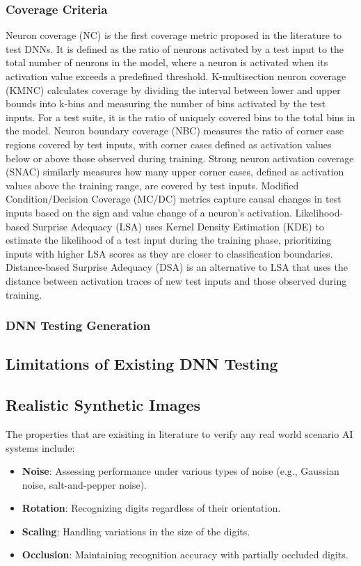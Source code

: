 \documentclass[10pt, conference, a4paper, final]{IEEEtran}
\begin{document}
\subsubsection{Coverage Criteria}
Neuron coverage (NC) is the first coverage metric proposed in the literature to test DNNs. It is defined as the ratio of neurons activated by a test input to the total number of neurons in the model, where a neuron is activated when its activation value exceeds a predefined threshold. K-multisection neuron coverage (KMNC) calculates coverage by dividing the interval between lower and upper bounds into k-bins and measuring the number of bins activated by the test inputs. For a test suite, it is the ratio of uniquely covered bins to the total bins in the model. Neuron boundary coverage (NBC) measures the ratio of corner case regions covered by test inputs, with corner cases defined as activation values below or above those observed during training. Strong neuron activation coverage (SNAC) similarly measures how many upper corner cases, defined as activation values above the training range, are covered by test inputs. Modified Condition/Decision Coverage (MC/DC) metrics capture causal changes in test inputs based on the sign and value change of a neuron’s activation. Likelihood-based Surprise Adequacy (LSA) uses Kernel Density Estimation (KDE) to estimate the likelihood of a test input during the training phase, prioritizing inputs with higher LSA scores as they are closer to classification boundaries. Distance-based Surprise Adequacy (DSA) is an alternative to LSA that uses the distance between activation traces of new test inputs and those observed during training.

\subsubsection{DNN Testing Generation}

\subsection{Limitations of Existing DNN Testing}

\subsection{Realistic Synthetic Images}
The properties that are exisiting in literature to verify any real world scenario AI systems include:
\begin{itemize}
    \item \textbf{Noise}: Assessing performance under various types of noise (e.g., Gaussian noise, salt-and-pepper noise).
    \item \textbf{Rotation}: Recognizing digits regardless of their orientation.
    \item \textbf{Scaling}: Handling variations in the size of the digits.

    \item \textbf{Occlusion}: Maintaining recognition accuracy with partially occluded digits.

\end{itemize}
\end{document}
